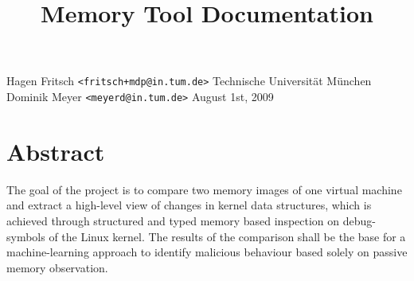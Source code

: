\documentclass[12pt,german,a4paper]{scrartcl}
\title{Memory Tool Documentation}
\begin{document}
\thispagestyle{empty}
\begin{center}
	\begin{flushleft}
		Hagen Fritsch \texttt{\small <fritsch+mdp@in.tum.de>} \hfill
		Technische Universität München \\
		Dominik Meyer  \texttt{\small <meyerd@in.tum.de>} \hfill August 1st, 2009
	\end{flushleft}
\end{center}

\tableofcontents{}

{}

\vfill
\section*{Abstract}
The goal of the project is to compare two memory images of one virtual machine and extract a high-level view
of changes in kernel data structures, which is achieved through structured and typed memory based inspection
on debug-symbols of the Linux kernel.
The results of the comparison shall be the base for a machine-learning approach to identify
malicious behaviour based solely on passive memory observation.

	
	
	
	
	

\begin{appendix}
  
\end{appendix}

%
%
\end{document}
